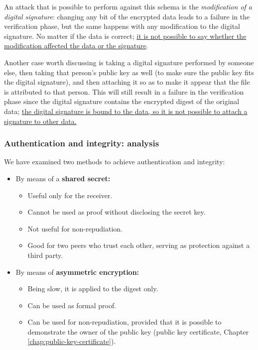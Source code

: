 An attack that is possible to perform against this schema is the \textit{modification of a digital signature}: changing any bit of the encrypted data leads to a failure in the verification phase, but the same happens with any modification to the digital signature. No matter if the data is correct; \underline{it is not possible to say whether the modification affected the data or the signature}.

Another case worth discussing is taking a digital signature performed by someone else, then taking that person's public key as well (to make sure the public key fits the digital signature), and then attaching it so as to make it appear that the file is attributed to that person. This will still result in a failure in the verification phase since the digital signature contains the encrypted digest of the original data; \ul{the digital signature is bound to the data, so it is not possible to attach a signature to other data.}


\subsubsection{Authentication and integrity: analysis}
We have examined two methods to achieve authentication and integrity:

\begin{itemize}
    \item By means of a \textbf{shared secret:}
    \begin{itemize}
        \item Useful only for the receiver.
        \item Cannot be used as proof without disclosing the secret key.
        \item Not useful for non-repudiation.
        \item Good for two peers who trust each other, serving as protection against a third party.
    \end{itemize}

    \item By means of \textbf{asymmetric encryption:}
    \begin{itemize}
        \item Being slow, it is applied to the digest only.
        \item Can be used as formal proof.
        \item Can be used for non-repudiation, provided that it is possible to demonstrate the owner of the public key (public key certificate, Chapter \ref*{chap:public-key-certificate}).
    \end{itemize}
\end{itemize}


